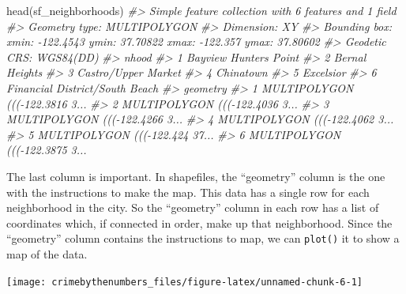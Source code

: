 \documentclass[
]{krantz}
\makeatletter
\newenvironment{Shaded}{\begin{snugshade}}{\end{snugshade}}
\newcommand{\CommentTok}[1]{\textcolor[rgb]{0.37,0.37,0.37}{\textit{#1}}}
\newcommand{\FunctionTok}[1]{\textcolor[rgb]{0,0,0}{#1}}
\newcommand{\NormalTok}[1]{#1}
\newcommand{\SpecialCharTok}[1]{\textcolor[rgb]{0,0,0}{#1}}
\newenvironment{kframe}{%
\medskip{}
\setlength{\fboxsep}{.8em}
 \def\at@end@of@kframe{}%
 \ifinner\ifhmode%
  \def\at@end@of@kframe{\end{minipage}}%
  \begin{minipage}{\columnwidth}%
 \fi\fi%
 \def\FrameCommand##1{\hskip\@totalleftmargin \hskip-\fboxsep
 \colorbox{shadecolor}{##1}\hskip-\fboxsep
     \hskip-\linewidth \hskip-\@totalleftmargin \hskip\columnwidth}%
 \MakeFramed {\advance\hsize-\width
   \@totalleftmargin\z@ \linewidth\hsize
   \@setminipage}}%
 {\par\unskip\endMakeFramed%
 \at@end@of@kframe}
\renewenvironment{Shaded}{\begin{kframe}}{\end{kframe}}
\makeatother
\begin{document}
\begin{Shaded}
\begin{Highlighting}[]
\FunctionTok{head}\NormalTok{(sf\_neighborhoods)}
\CommentTok{\#\textgreater{} Simple feature collection with 6 features and 1 field}
\CommentTok{\#\textgreater{} Geometry type: MULTIPOLYGON}
\CommentTok{\#\textgreater{} Dimension:     XY}
\CommentTok{\#\textgreater{} Bounding box:  xmin: {-}122.4543 ymin: 37.70822 xmax: {-}122.357 ymax: 37.80602}
\CommentTok{\#\textgreater{} Geodetic CRS:  WGS84(DD)}
\CommentTok{\#\textgreater{}                            nhood}
\CommentTok{\#\textgreater{} 1          Bayview Hunters Point}
\CommentTok{\#\textgreater{} 2                 Bernal Heights}
\CommentTok{\#\textgreater{} 3            Castro/Upper Market}
\CommentTok{\#\textgreater{} 4                      Chinatown}
\CommentTok{\#\textgreater{} 5                      Excelsior}
\CommentTok{\#\textgreater{} 6 Financial District/South Beach}
\CommentTok{\#\textgreater{}                         geometry}
\CommentTok{\#\textgreater{} 1 MULTIPOLYGON ((({-}122.3816 3...}
\CommentTok{\#\textgreater{} 2 MULTIPOLYGON ((({-}122.4036 3...}
\CommentTok{\#\textgreater{} 3 MULTIPOLYGON ((({-}122.4266 3...}
\CommentTok{\#\textgreater{} 4 MULTIPOLYGON ((({-}122.4062 3...}
\CommentTok{\#\textgreater{} 5 MULTIPOLYGON ((({-}122.424 37...}
\CommentTok{\#\textgreater{} 6 MULTIPOLYGON ((({-}122.3875 3...}
\end{Highlighting}
\end{Shaded}

The last column is important. In shapefiles, the ``geometry'' column is the one with the instructions to make the map. This data has a single row for each neighborhood in the city. So the ``geometry'' column in each row has a list of coordinates which, if connected in order, make up that neighborhood. Since the ``geometry'' column contains the instructions to map, we can \texttt{plot()} it to show a map of the data.

\begin{Shaded}
\end{Shaded}

\begin{center}\texttt{[image: crimebythenumbers\_files/figure-latex/unnamed-chunk-6-1]} \end{center}
\end{document}
